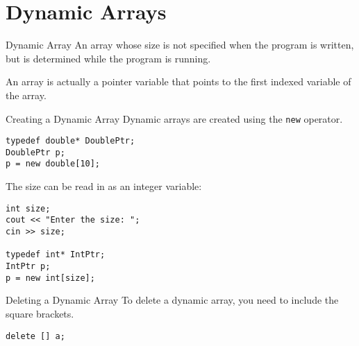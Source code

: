 \documentclass[\main/notes.tex]{subfiles}
\begin{document}
		\section{Dynamic Arrays}
			\begin{definition}{Dynamic Array}
				An array whose size is not specified when the program is written, but is determined while the program is running.
			\end{definition}
			An array is actually a pointer variable that points to the first indexed variable of the array.
			\begin{definition}{Creating a Dynamic Array}
				Dynamic arrays are created using the \texttt{new} operator.
				\begin{verbatim}
typedef double* DoublePtr;
DoublePtr p;
p = new double[10];
				\end{verbatim}
				The size can be read in as an integer variable:
				\begin{verbatim}
int size;
cout << "Enter the size: ";
cin >> size;

typedef int* IntPtr;
IntPtr p;
p = new int[size];
				\end{verbatim}
			\end{definition}
			\begin{sidenote}{Deleting a Dynamic Array}
				To delete a dynamic array, you need to include the square brackets.
				\begin{verbatim}
delete [] a;
				\end{verbatim}
			\end{sidenote}
\end{document}
